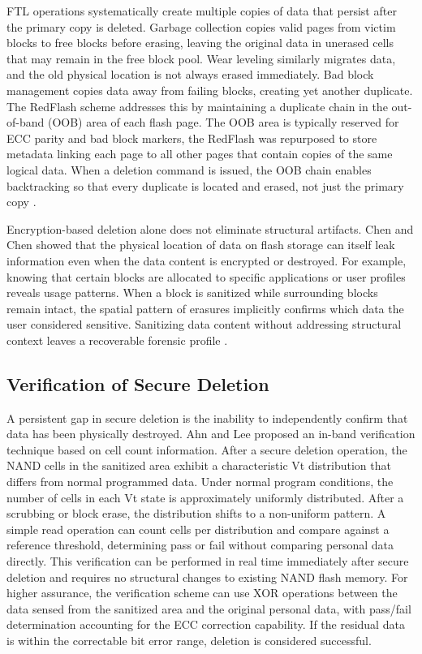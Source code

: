 FTL operations systematically create multiple copies of data that persist after the primary copy is 
deleted. Garbage collection copies valid pages from victim blocks to free blocks before erasing, 
leaving the original data in unerased cells that may remain in the free block pool. Wear leveling 
similarly migrates data, and the old physical location is not always erased immediately. Bad block 
management copies data away from failing blocks, creating yet another duplicate. The RedFlash 
scheme addresses this by maintaining a duplicate chain in the out-of-band (OOB) area of each flash 
page. The OOB area is typically reserved for ECC parity and bad block markers, the RedFlash was 
repurposed to store metadata linking each page to all other pages that contain copies of the same 
logical data. When a deletion command is issued, the OOB chain enables backtracking so that every 
duplicate is located and erased, not just the primary copy \cite{duplicateschen2022}.

Encryption-based deletion alone does not eliminate structural artifacts. Chen and Chen showed that 
the physical location of data on flash storage can itself leak information even when the data 
content is encrypted or destroyed. For example, knowing that certain blocks are allocated to 
specific applications or user profiles reveals usage patterns. When a block is sanitized while 
surrounding blocks remain intact, the spatial pattern of erasures implicitly confirms which data 
the user considered sensitive. Sanitizing data content without addressing structural context leaves 
a recoverable forensic profile \cite{aronsson2025secure}.

\subsection{Verification of Secure Deletion}

A persistent gap in secure deletion is the inability to independently confirm that data has been 
physically destroyed. Ahn and Lee proposed an in-band verification technique based on cell count 
information. After a secure deletion operation, the NAND cells in the sanitized area exhibit a 
characteristic Vt distribution that differs from normal programmed data. Under normal program 
conditions, the number of cells in each Vt state is approximately uniformly distributed. After a 
scrubbing or block erase, the distribution shifts to a non-uniform pattern. A simple read operation 
can count cells per distribution and compare against a reference threshold, determining pass or 
fail without comparing personal data directly. This verification can be performed in real time 
immediately after secure deletion and requires no structural changes to existing NAND flash memory.
For higher assurance, the verification scheme can use XOR operations between the data sensed from 
the sanitized area and the original personal data, with pass/fail determination accounting for the 
ECC correction capability. If the residual data is within the correctable bit error range, deletion 
is considered successful. \cite{ahn2021forensics}

